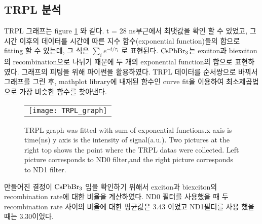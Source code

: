 \subsection{TRPL 분석}
TRPL 그래프는 figure \ref{fig:FIR105} 와 같다. t = 28 ns부근에서 최댓값을 확인 할 수 있었고, 그 시간 이후의 데이터를 시간에 따른 지수 함수(exponential function)들의 합으로 fitting 할 수 있는데, 그 식은 $\sum_{i}^{} {e}^{-t/{\tau}_{i}}$ 로 표현된다. $\rm{CsPbBr_3}$는 exciton과 biexciton의 recombination으로 나뉘기 때문에 두 개의 exponential function의 합으로 표현하였다. 그래프의 피팅을 위해 파이썬을 활용하였다. TRPL 데이터를 순서쌍으로 바꿔서 그래프를 그린 후, mathplot library에 내재된 함수인 curve fit을 이용하여 최소제곱법으로 가장 비슷한 함수를 찾아낸다.
\begin{figure}[h]
	\begin{center}
		\begin{tabular}{c}
			\texttt{[image: TRPL\_graph]}
		\end{tabular}
		\caption{TRPL graph was fitted with sum of exponential functions.x axis is time(ns) y axis is the intensity of signal(a.u.). Two pictures at the right top shows the point where the TRPL datas were collected. Left picture corresponds to ND0 filter,and the right picture corresponds to ND1 filter. }	
		\label{fig:FIR105}
	\end{center}
\end{figure}
 만들어진 결정이 $\rm{CsPbBr_3}$ 임을 확인하기 위해서 exciton과 biexciton의 recombination rate에 대한 비율을 계산하였다. ND0 필터를 사용했을 때 두 recombination rate 사이의 비율에 대한 평균값은 3.43 이었고 ND1필터를 사용 했을 때는 3.30이었다.
